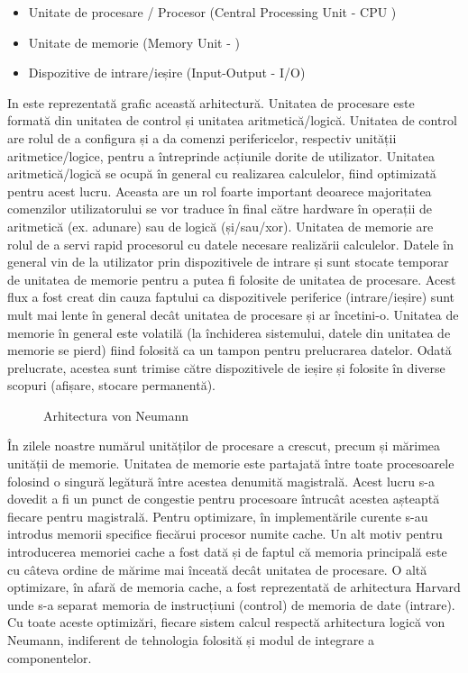 \begin{itemize}
	\item Unitate de procesare / Procesor (Central Processing Unit - CPU
		)
	\item Unitate de memorie (Memory Unit - )
	\item Dispozitive de intrare/ieșire (Input-Output - I/O)
\end{itemize}

In  este reprezentată grafic această
arhitectură. Unitatea de procesare este formată din unitatea de control și
unitatea aritmetică/logică. Unitatea de control are rolul de a configura și a da
comenzi perifericelor, respectiv unității aritmetice/logice, pentru a
întreprinde acțiunile dorite de utilizator. Unitatea aritmetică/logică se ocupă
în general cu realizarea calculelor, fiind optimizată pentru acest lucru.
Aceasta are un rol foarte important deoarece majoritatea comenzilor
utilizatorului se vor traduce în final către hardware în operații de aritmetică
(ex. adunare) sau de logică (și/sau/xor). Unitatea de memorie are rolul de a
servi rapid procesorul cu datele necesare realizării calculelor. Datele în
general vin de la utilizator prin dispozitivele de intrare și sunt stocate
temporar de unitatea de memorie pentru a putea fi folosite de unitatea de
procesare. Acest flux a fost creat din cauza faptului ca dispozitivele
periferice (intrare/ieșire) sunt mult mai lente în general decât unitatea de
procesare și ar încetini-o. Unitatea de memorie în general este volatilă (la
închiderea sistemului, datele din unitatea de memorie se pierd) fiind folosită
ca un tampon pentru prelucrarea datelor. Odată prelucrate, acestea sunt trimise
către dispozitivele de ieșire și folosite în diverse scopuri (afișare, stocare
permanentă).

\begin{figure}[!htbp]
	\centering
	\def\svgwidth{\columnwidth}
	
	\caption{Arhitectura von Neumann}
	\label{fig:hw-neumann}
\end{figure}

În zilele noastre numărul unităților de procesare a crescut, precum și mărimea
unității de memorie. Unitatea de memorie este partajată între toate
procesoarele folosind o singură legătură între acestea denumită magistrală.
Acest lucru s-a dovedit a fi un punct de congestie pentru procesoare întrucât
acestea așteaptă fiecare pentru magistrală. Pentru optimizare, în implementările
curente s-au introdus memorii specifice fiecărui procesor numite cache. Un alt
motiv pentru introducerea memoriei cache a fost dată și de faptul că memoria
principală este cu câteva ordine de mărime mai înceată decât unitatea de
procesare. O altă optimizare, în afară de memoria cache, a fost reprezentată de
arhitectura Harvard unde s-a separat memoria de instrucțiuni (control) de
memoria de date (intrare). Cu toate aceste optimizări, fiecare sistem calcul
respectă arhitectura logică von Neumann, indiferent de tehnologia folosită și
modul de integrare a componentelor.

